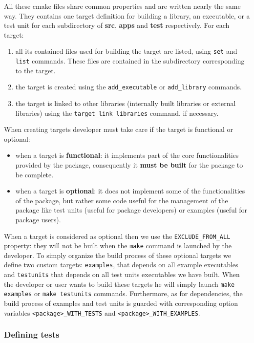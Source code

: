 \documentclass[12pt,a4paper]{article}
\begin{document}
All these cmake files share common properties and are written nearly the same way. They contains one target definition for building a library, an executable, or a test unit for each subdirectory of \textbf{src}, \textbf{apps} and \textbf{test} respectively. For each target:
\begin{enumerate}
\item all its contained files used for building the target are listed, using \texttt{set} and \texttt{list} commands. These files are contained in the subdirectory corresponding to the target.
\item the target is created using the \texttt{add\_executable} or \texttt{add\_library} commands. 
\item the target is linked to other libraries (internally built libraries or external libraries) using the \texttt{target\_link\_libraries} command, if necessary.
\end{enumerate}

When creating targets developer must take care if the target is functional or optional:
\begin{itemize}
\item when a target is \textbf{functional}: it implements part of the core functionalities provided by the package, consequently it \textbf{must be built} for the package to be complete.
\item when a target is \textbf{optional}: it does not implement some of the functionalities of the package, but rather some code useful for the management of the package like test units (useful for package developers) or examples (useful for package users).
\end{itemize}
When a target is considered as optional then we use the \texttt{EXCLUDE\_FROM\_ALL} property: they will not be built when the \texttt{make} command is launched by the developer. To simply organize the build process of these optional targets we define two custom targets: \texttt{examples}, that depends on all example executables and \texttt{testunits} that depends on all test units executables we have built. When the developer or user wants to build these targets he will simply launch \texttt{make examples} or \texttt{make testunits} commands. Furthermore, as for dependencies, the build process of examples and test units is guarded with corresponding option variables \texttt{<package>\_WITH\_TESTS} and \texttt{<package>\_WITH\_EXAMPLES}.

\subsubsection{Defining tests}
\end{document}
